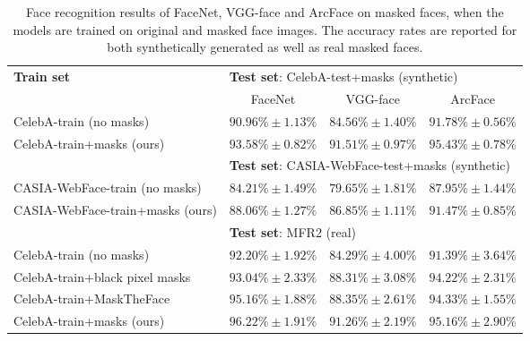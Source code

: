 \documentclass{article}
\begin{document}
\begin{table}
\begin{center}
\setlength\tabcolsep{4.5pt}
\begin{tabular}{|l|c|c|c|}
    \hline
    \multirow{2}{*}{\bf Train set} & \multicolumn{3}{|l|}{{\bf Test set}: CelebA-test+masks (synthetic)} \\
\cline{2-4}
    & FaceNet & VGG-face & ArcFace\\
    \hline
    \hline
    CelebA-train (no masks) & $90.96\%\pm1.13\%$ & $84.56\%\pm1.40\%$ & $91.78\%\pm0.56\%$\\
    \hline
    CelebA-train+masks (ours)  & $93.58\%\pm0.82\%$ & $91.51\%\pm0.97\%$ & $95.43\%\pm0.78\%$\\
    \hline
     & \multicolumn{3}{|l|}{{\bf Test set}: CASIA-WebFace-test+masks (synthetic)} \\
     \hline
    CASIA-WebFace-train (no masks) & $84.21\%\pm1.49\%$ & $79.65\%\pm1.81\%$ & $87.95\%\pm1.44\%$\\
    \hline
    CASIA-WebFace-train+masks (ours)  & $88.06\%\pm1.27\%$ & $86.85\%\pm1.11\%$ & $91.47\%\pm0.85\%$\\
    \hline
    & \multicolumn{3}{|l|}{{\bf Test set}: MFR2 (real)} \\
     \hline
     CelebA-train (no masks) & $92.20\%\pm1.92\%$ & $84.29\%\pm4.00\%$ & $91.39\%\pm3.64\%$\\
     \hline
    CelebA-train+black pixel masks  & $93.04\%\pm2.33\%$ & $88.31\%\pm3.08\%$ & $94.22\%\pm2.31\%$\\
    \hline
    CelebA-train+MaskTheFace \cite{anwar2020arxiv}  & $95.16\%\pm1.88\%$ & $88.35\%\pm2.61\%$ & $94.33\%\pm1.55\%$\\
    \hline
    CelebA-train+masks (ours)  & $96.22\%\pm1.91\%$ & $91.26\%\pm2.19\%$ & $95.16\%\pm2.90\%$\\
    \hline
\end{tabular}
\end{center}
\caption{Face recognition results of FaceNet, VGG-face and ArcFace on masked faces, when the models are trained on original and masked face images. The accuracy rates are reported for both synthetically generated as well as real masked faces.} 
\label{tab:quantitative-results}
\end{table} 
\end{document}
